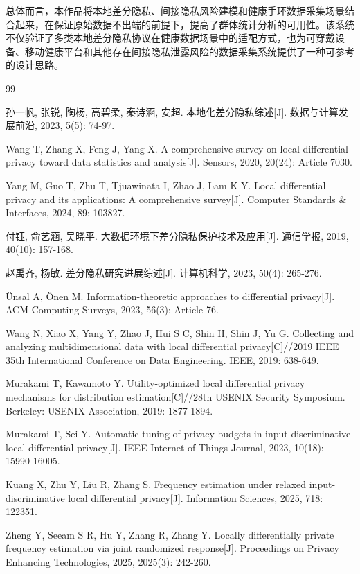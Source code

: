 \documentclass{cumcmthesis}
\numberwithin{equation}{section}
\numberwithin{figure}{section}
\numberwithin{table}{section}
\begin{document}
总体而言，本作品将本地差分隐私、间接隐私风险建模和健康手环数据采集场景结合起来，在保证原始数据不出端的前提下，提高了群体统计分析的可用性。该系统不仅验证了多类本地差分隐私协议在健康数据场景中的适配方式，也为可穿戴设备、移动健康平台和其他存在间接隐私泄露风险的数据采集系统提供了一种可参考的设计思路。

\begin{thebibliography}{99}

孙一帆, 张锐, 陶杨, 高碧柔, 秦诗涵, 安超. 本地化差分隐私综述[J]. 数据与计算发展前沿, 2023, 5(5): 74-97.

Wang T, Zhang X, Feng J, Yang X. A comprehensive survey on local differential privacy toward data statistics and analysis[J]. Sensors, 2020, 20(24): Article 7030.

Yang M, Guo T, Zhu T, Tjuawinata I, Zhao J, Lam K Y. Local differential privacy and its applications: A comprehensive survey[J]. Computer Standards \& Interfaces, 2024, 89: 103827.

付钰, 俞艺涵, 吴晓平. 大数据环境下差分隐私保护技术及应用[J]. 通信学报, 2019, 40(10): 157-168.

赵禹齐, 杨敏. 差分隐私研究进展综述[J]. 计算机科学, 2023, 50(4): 265-276.

Ünsal A, Önen M. Information-theoretic approaches to differential privacy[J]. ACM Computing Surveys, 2023, 56(3): Article 76.

Wang N, Xiao X, Yang Y, Zhao J, Hui S C, Shin H, Shin J, Yu G. Collecting and analyzing multidimensional data with local differential privacy[C]//2019 IEEE 35th International Conference on Data Engineering. IEEE, 2019: 638-649.

Murakami T, Kawamoto Y. Utility-optimized local differential privacy mechanisms for distribution estimation[C]//28th USENIX Security Symposium. Berkeley: USENIX Association, 2019: 1877-1894.

Murakami T, Sei Y. Automatic tuning of privacy budgets in input-discriminative local differential privacy[J]. IEEE Internet of Things Journal, 2023, 10(18): 15990-16005.

Kuang X, Zhu Y, Liu R, Zhang S. Frequency estimation under relaxed input-discriminative local differential privacy[J]. Information Sciences, 2025, 718: 122351.

Zheng Y, Seeam S R, Hu Y, Zhang R, Zhang Y. Locally differentially private frequency estimation via joint randomized response[J]. Proceedings on Privacy Enhancing Technologies, 2025, 2025(3): 242-260.


\end{thebibliography}
\end{document}
